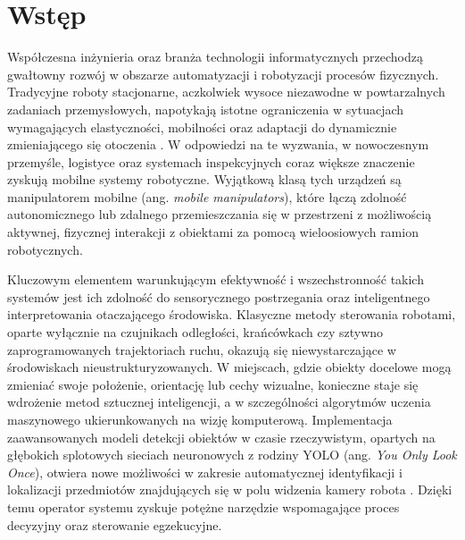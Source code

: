 \documentclass[11pt]{extreport}
\begin{document}
\chapter{Wstęp}

Współczesna inżynieria oraz branża technologii informatycznych przechodzą gwałtowny rozwój w obszarze automatyzacji i robotyzacji procesów fizycznych. Tradycyjne roboty stacjonarne, aczkolwiek wysoce niezawodne w powtarzalnych zadaniach przemysłowych, napotykają istotne ograniczenia w sytuacjach wymagających elastyczności, mobilności oraz adaptacji do dynamicznie zmieniającego się otoczenia \cite{dirac}. W odpowiedzi na te wyzwania, w nowoczesnym przemyśle, logistyce oraz systemach inspekcyjnych coraz większe znaczenie zyskują mobilne systemy robotyczne. Wyjątkową klasą tych urządzeń są manipulatorem mobilne (ang. \textit{mobile manipulators}), które łączą zdolność autonomicznego lub zdalnego przemieszczania się w przestrzeni z możliwością aktywnej, fizycznej interakcji z obiektami za pomocą wieloosiowych ramion robotycznych.

Kluczowym elementem warunkującym efektywność i wszechstronność takich systemów jest ich zdolność do sensorycznego postrzegania oraz inteligentnego interpretowania otaczającego środowiska. Klasyczne metody sterowania robotami, oparte wyłącznie na czujnikach odległości, krańcówkach czy sztywno zaprogramowanych trajektoriach ruchu, okazują się niewystarczające w środowiskach nieustrukturyzowanych. W miejscach, gdzie obiekty docelowe mogą zmieniać swoje położenie, orientację lub cechy wizualne, konieczne staje się wdrożenie metod sztucznej inteligencji, a w szczególności algorytmów uczenia maszynowego ukierunkowanych na wizję komputerową. Implementacja zaawansowanych modeli detekcji obiektów w czasie rzeczywistym, opartych na głębokich splotowych sieciach neuronowych z rodziny YOLO (ang. \textit{You Only Look Once}), otwiera nowe możliwości w zakresie automatycznej identyfikacji i lokalizacji przedmiotów znajdujących się w polu widzenia kamery robota \cite{einstein}. Dzięki temu operator systemu zyskuje potężne narzędzie wspomagające proces decyzyjny oraz sterowanie egzekucyjne.
\end{document}
